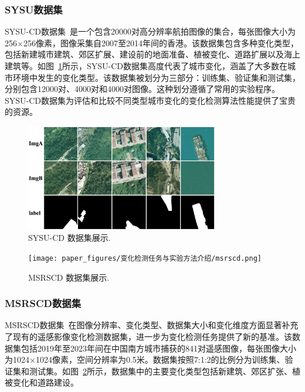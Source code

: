 \subsubsection{SYSU数据集}
SYSU-CD数据集~\cite{shi_deeply_2022}是一个包含20000对高分辨率航拍图像的集合，每张图像大小为256×256像素，图像采集自2007至2014年间的香港。该数据集包含多种变化类型，包括新建城市建筑、郊区扩展、建设前的地面准备、植被变化、道路扩展以及海上建筑等。如图~\ref{fig:sysu}所示，SYSU-CD数据集高度代表了城市变化，涵盖了大多数在城市环境中发生的变化类型。该数据集被划分为三部分：训练集、验证集和测试集，分别包含12000对、4000对和4000对图像。这种划分遵循了常用的实验程序。SYSU-CD数据集为评估和比较不同类型城市变化的变化检测算法性能提供了宝贵的资源。

\begin{figure}[!htb]
  \centering
  \includegraphics[width=0.75\textwidth]{paper_figures/变化检测任务与实验方法介绍/sysu.png}
  \caption{SYSU-CD 数据集展示.}
  \label{fig:sysu}
\end{figure}

\begin{figure}[!htb]
  \centering
  \texttt{[image: paper\_figures/变化检测任务与实验方法介绍/msrscd.png]}
  \caption{MSRSCD 数据集展示.}
  \label{fig:msrscd}
\end{figure}


\subsubsection{MSRSCD数据集}
MSRSCD数据集~\cite{Liu2025NetworkAD}在图像分辨率、变化类型、数据集大小和变化维度方面显著补充了现有的遥感影像变化检测数据集，进一步为变化检测任务提供了新的基准。该数据集包括2019年至2023年间在中国南方城市捕获的841对遥感图像，每张图像大小为1024×1024像素，空间分辨率为0.5米。数据集按照7:1:2的比例分为训练集、验证集和测试集。如图~\ref{fig:msrscd}所示，数据集中的主要变化类型包括新建筑、郊区扩张、植被变化和道路建设。

